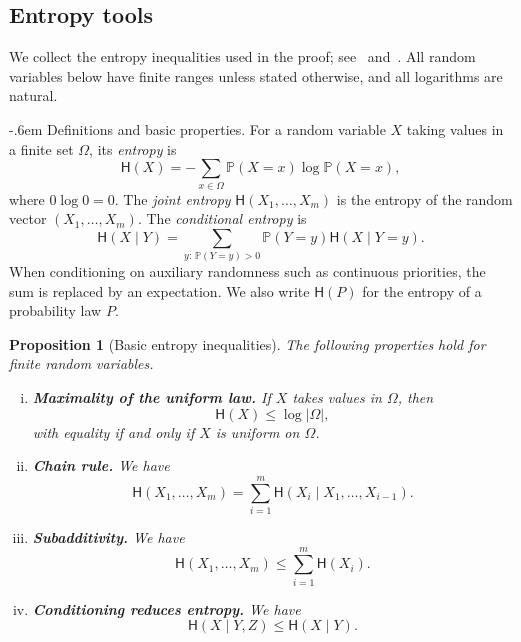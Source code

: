 \documentclass[11pt,reqno]{amsart}
\makeatletter
\numberwithin{equation}{section}
\renewcommand{\paragraph}{\@startsection{paragraph}{4}%
    \z@{.75\linespacing\@plus.2\linespacing\@minus.1\linespacing}%
    {-.6em}%
    {\normalfont\bfseries}}
\theoremstyle{plain}
\newtheorem{proposition}[theorem]{Proposition}
\theoremstyle{definition}
\newcommand{\Prob}{\mathbb P}
\newcommand{\HH}{\mathsf H}
\makeatother
\begin{document}

\subsection{Entropy tools}\label{subsec:entropytools}

We collect the entropy inequalities used in the proof; see~\cite[Chapter~2]{CoverThomas} and~\cite[Chapter~4]{BLM}.
All random variables below have finite ranges unless stated otherwise, and all logarithms are natural.

\paragraph{Definitions and basic properties.}
For a random variable $X$ taking values in a finite set $\Omega$, its \emph{entropy} is
\[
    \HH(X)=-\sum_{x\in\Omega}\Prob(X=x)\log\Prob(X=x),
\]
where $0\log0=0$.
The \emph{joint entropy} $\HH(X_1,\ldots,X_m)$ is the entropy of the random vector $(X_1,\ldots,X_m)$.
The \emph{conditional entropy} is
\[
    \HH(X\mid Y)=\sum_{y:\,\Prob(Y=y)>0}\Prob(Y=y)\HH(X\mid Y=y).
\]
When conditioning on auxiliary randomness such as continuous priorities, the sum is replaced by an expectation.
We also write $\HH(P)$ for the entropy of a probability law $P$.

\begin{proposition}[Basic entropy inequalities]\label{prop:entropybasics}
    The following properties hold for finite random variables.
    \begin{enumerate}[(i)]
        \item \textbf{Maximality of the uniform law.} If $X$ takes values in $\Omega$, then
            \[
                \HH(X)\le\log|\Omega|,
            \]
            with equality if and only if $X$ is uniform on $\Omega$.
        \item \textbf{Chain rule.} We have
            \[
                \HH(X_1,\ldots,X_m)=\sum_{i=1}^m\HH(X_i\mid X_1,\ldots,X_{i-1}).
            \]
        \item \textbf{Subadditivity.} We have
            \[
                \HH(X_1,\ldots,X_m)\le\sum_{i=1}^m\HH(X_i).
            \]
        \item \textbf{Conditioning reduces entropy.} We have
            \[
                \HH(X\mid Y,Z)\le\HH(X\mid Y).
            \]
    \end{enumerate}
\end{proposition}
\end{document}
